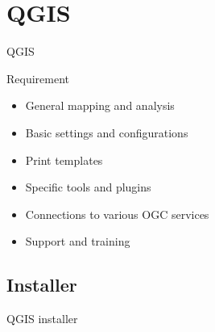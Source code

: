 \section{QGIS}

\begin{frame}{QGIS}
		\begin{block}{Requirement}
			\begin{itemize}
				\item General mapping and analysis
				\item Basic settings and configurations
				\item Print templates
				\item Specific tools and plugins 
				\item Connections to various OGC services
				\item Support and training
			\end{itemize}
		\end{block}
\end{frame}


\subsection{Installer}
\begin{frame}{QGIS installer}


\end{frame}


